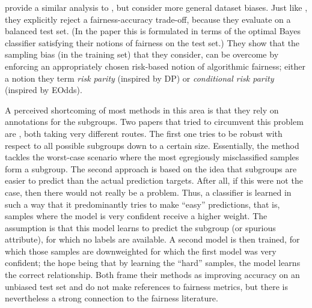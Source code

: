 \citet{maity2020notradeoff} provide a similar analysis to \citet{blum2020recovering},
but consider more general dataset biases.
Just like \citet{blum2020recovering}, they explicitly reject a fairness-accuracy trade-off,
because they evaluate on a balanced test set.
(In the paper this is formulated in terms of the optimal Bayes classifier satisfying their notions of fairness on the test set.)
They show that the sampling bias (in the training set) that they consider,
can be overcome by enforcing an appropriately chosen risk-based notion of algorithmic fairness;
either a notion they term \emph{risk parity} (inspired by \ac{DP})
or \emph{conditional risk parity} (inspired by \ac{EOdds}).

A perceived shortcoming of most methods in this area is that they rely on annotations for the subgroups.
Two papers that tried to circumvent this problem are \citet{HasSriNamLia18,nam2020learning},
both taking very different routes.
The first one tries to be robust with respect to all possible subgroups down to a certain size.
Essentially, the method tackles the worst-case scenario where the most egregiously misclassified samples form a subgroup.
The second approach is based on the idea that subgroups are easier to predict than the actual prediction targets.
After all, if this were not the case, then there would not really be a problem.
Thus, a classifier is learned in such a way that it predominantly tries to make ``easy'' predictions,
that is, samples where the model is very confident receive a higher weight.
The assumption is that this model learns to predict the subgroup (or spurious attribute),
for which no labels are available.
A second model is then trained, for which those samples are downweighted for which the first model was very confident;
the hope being that by learning the ``hard'' samples, the model learns the correct relationship.
Both \citet{HasSriNamLia18,nam2020learning} frame their methods as improving accuracy on an unbiased test set
and do not make references to fairness metrics,
but there is nevertheless a strong connection to the fairness literature.


